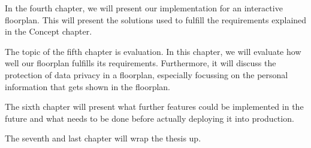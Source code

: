 In the fourth chapter, we will present our implementation for an interactive floorplan. This will present the solutions used to fulfill the requirements explained in the Concept chapter.

The topic of the fifth chapter is evaluation. In this chapter, we will evaluate how well our floorplan fulfills its requirements. Furthermore, it will discuss the protection of data privacy in a floorplan, especially focussing on the personal information that gets shown in the floorplan.

The sixth chapter will present what further features could be implemented in the future and what needs to be done before actually deploying it into production. 

The seventh and last chapter will wrap the thesis up.

\clearpage